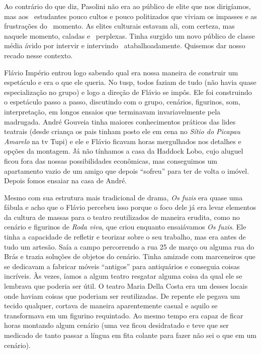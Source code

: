 Ao contrário do que diz, Pasolini não era ao público de elite que nos
dirigíamos, mas aos~ estudantes pouco cultos e pouco politizados que
viviam os impasses e as frustrações do~ momento. As elites culturais
estavam ali, com certeza, mas naquele momento, caladas e~ perplexas.
Tinha surgido um novo público de classe média ávido por intervir e
intervindo~ atabalhoadamente. Quisemos dar nosso recado nesse contexto.

Flávio Império entrou logo sabendo qual era nossa maneira de construir
um espetáculo e era o que ele queria. No {\sc tusp}, todos faziam de tudo (não
havia quase especialização no grupo) e logo a direção de Flávio se
impôs. Ele foi construindo o espetáculo passo a passo, discutindo com o
grupo, cenários, figurinos, som, interpretação, em longos ensaios que
terminavam invariavelmente pela madrugada. André Gouveia tinha maiores
conhecimentos práticos das lides teatrais (desde criança os pais tinham
posto ele em cena no {\it Sítio do Picapau Amarelo} na {\sc tv} Tupi) e ele e
Flávio ficavam horas mergulhados nos detalhes e opções da montagem. Já
não tínhamos a casa da Haddock Lobo, cujo aluguel ficou fora das nossas
possibilidades econômicas, mas conseguimos um apartamento vazio de um
amigo que depois “sofreu” para ter de volta o imóvel. Depois fomos
ensaiar na casa de André.

Mesmo com sua estrutura mais tradicional de drama, {\it Os fuzis} era
quase uma fábula e acho que o Flávio percebeu isso porque o foco dele já
era levar elementos da cultura de massas para o teatro reutilizados de
maneira erudita, como no cenário e figurinos de {\it Roda viva}, que
criou enquanto ensaiávamos {\it Os fuzis}. Ele tinha a capacidade de
refletir e teorizar sobre o seu trabalho, mas era antes de tudo um
artesão. Saía a campo percorrendo a rua 25 de março ou alguma rua do
Brás e trazia soluções de objetos do cenário. Tinha amizade com
marceneiros que se dedicavam a fabricar móveis “antigos” para
antiquários e conseguia coisas incríveis. Às vezes, íamos a algum teatro
resgatar alguma coisa da qual ele se lembrava que poderia ser útil. O
teatro Maria Della Costa era um desses locais onde haviam coisas que
poderiam ser reutilizadas. De repente ele pegava um tecido qualquer,
cortava de maneira aparentemente casual e aquilo se transformava em um
figurino requintado. Ao mesmo tempo era capaz de ficar horas montando
algum cenário (uma vez ficou desidratado e teve que ser medicado de
tanto passar a língua em fita colante para fazer não sei o que em um
cenário).

